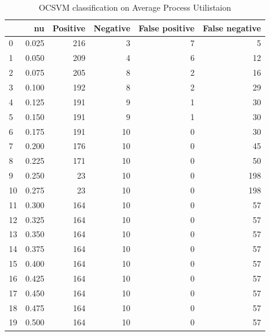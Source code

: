 \documentclass[a4paper,twoside,12pt]{book}
\begin{document}
\begin{appendices}
\begin{table}
	\centering
	\caption{OCSVM classification on Average Process Utilistaion}
	\label{id:tab:OCSVMonProc}
	\begin{tabular}{lrrrrr}
		\toprule
		{} &     nu &  Positive &  Negative &  False positive &  False negative \\
		\midrule
		0  &  0.025 &       216 &         3 &               7 &               5 \\
		1  &  0.050 &       209 &         4 &               6 &              12 \\
		2  &  0.075 &       205 &         8 &               2 &              16 \\
		3  &  0.100 &       192 &         8 &               2 &              29 \\
		4  &  0.125 &       191 &         9 &               1 &              30 \\
		5  &  0.150 &       191 &         9 &               1 &              30 \\
		6  &  0.175 &       191 &        10 &               0 &              30 \\
		7  &  0.200 &       176 &        10 &               0 &              45 \\
		8  &  0.225 &       171 &        10 &               0 &              50 \\
		9  &  0.250 &        23 &        10 &               0 &             198 \\
		10 &  0.275 &        23 &        10 &               0 &             198 \\
		11 &  0.300 &       164 &        10 &               0 &              57 \\
		12 &  0.325 &       164 &        10 &               0 &              57 \\
		13 &  0.350 &       164 &        10 &               0 &              57 \\
		14 &  0.375 &       164 &        10 &               0 &              57 \\
		15 &  0.400 &       164 &        10 &               0 &              57 \\
		16 &  0.425 &       164 &        10 &               0 &              57 \\
		17 &  0.450 &       164 &        10 &               0 &              57 \\
		18 &  0.475 &       164 &        10 &               0 &              57 \\
		19 &  0.500 &       164 &        10 &               0 &              57 \\

\end{tabular}
\end{table}
\end{appendices}
\end{document}
